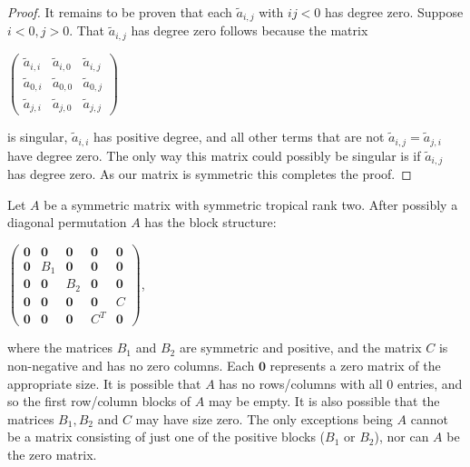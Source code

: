 \documentclass{article}
\begin{document}
\begin{proof}
  It remains to be proven that each $\tilde{a}_{i,j}$ with $ij < 0$ has degree zero. Suppose $i < 0, j > 0$. That $\tilde{a}_{i,j}$ has degree zero follows because the matrix
  \begin{center}
    $\left(\begin{array}{ccc} \tilde{a}_{i,i} & \tilde{a}_{i,0} & \tilde{a}_{i,j} \\ \tilde{a}_{0,i} & \tilde{a}_{0,0} & \tilde{a}_{0,j} \\ \tilde{a}_{j,i} & \tilde{a}_{j,0} & \tilde{a}_{j,j} \end{array}\right)$
  \end{center}   
  is singular, $\tilde{a}_{i,i}$ has positive degree, and all other terms that are not $\tilde{a}_{i,j} = \tilde{a}_{j,i}$ have degree zero. The only way this matrix could possibly be singular is if $\tilde{a}_{i,j}$ has degree zero. As our matrix is symmetric this completes the proof.
\end{proof}

\begin{lem}
  Let $A$ be a symmetric matrix with symmetric tropical rank two. After possibly a diagonal permutation $A$ has the block structure:
  \begin{center}
    $\left(\begin{array}{ccccc} \textbf{0} & \textbf{0} & \textbf{0} & \textbf{0} & \textbf{0} \\ \textbf{0} & B_{1} & \textbf{0} & \textbf{0} & \textbf{0} \\ \textbf{0} & \textbf{0} & B_{2} & \textbf{0} & \textbf{0} \\ \textbf{0} & \textbf{0} & \textbf{0} & \textbf{0} & C \\ \textbf{0} & \textbf{0} & \textbf{0} & C^{T} & \textbf{0} \end{array}\right)$,
  \end{center}
  where the matrices $B_{1}$ and $B_{2}$ are symmetric and positive, and the matrix $C$ is non-negative and has no zero columns. Each $\textbf{0}$ represents a zero matrix of the appropriate size.  It is possible that $A$ has no rows/columns with all $0$ entries, and so the first row/column blocks of $A$ may be empty. It is also possible that the matrices $B_{1}, B_{2}$ and $C$ may have size zero. The only exceptions being $A$ cannot be a matrix consisting of just one of the positive blocks ($B_{1}$ or $B_{2}$), nor can $A$ be the zero matrix. 
\end{lem}
\end{document}
